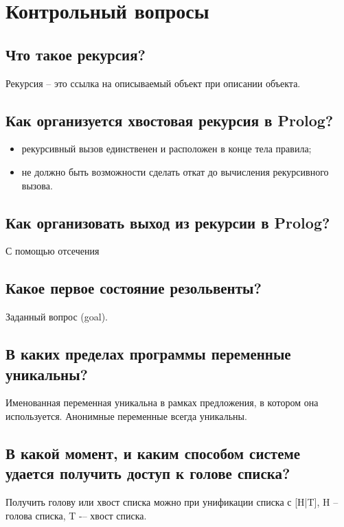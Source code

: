\chapter{Контрольный вопросы}

\section{Что такое рекурсия?}

Рекурсия – это ссылка на описываемый объект при описании объекта.

\section{Как организуется хвостовая рекурсия в Prolog?}

\begin{itemize}
    \item рекурсивный вызов единственен и расположен в конце тела правила;
    \item не должно быть возможности сделать откат до вычисления рекурсивного вызова.
\end{itemize}

\section{Как организовать выход из рекурсии в Prolog?}

С помощью отсечения

\section{Какое первое состояние резольвенты?}

Заданный вопрос (goal).

\section{В каких пределах программы переменные уникальны?}

Именованная переменная уникальна в рамках предложения, в котором она используется. Анонимные переменные всегда уникальны.

\section{В какой момент, и каким способом системе удается получить доступ к голове списка?}

Получить голову или хвост списка можно при унификации списка с [H|T], H -- голова списка, T -– хвост списка.

